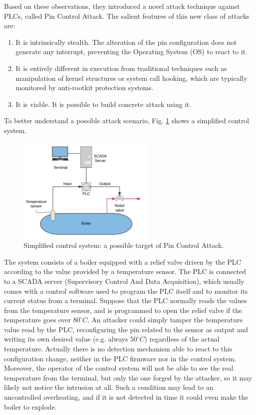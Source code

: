 Based on these observations, they introduced a novel attack technique against PLCs, called Pin Control Attack.
The salient features of this new class of attacks are:
\begin{enumerate}
	\item It is intrinsically stealth. The alteration of the pin configuration does not generate any interrupt, preventing the Operating System (OS) to react to it.
	\item It is entirely different in execution from traditional techniques such as manipulation of kernel structures or system call hooking, which are typically
		monitored by anti-rootkit protection systems.
	\item It is viable. It is possible to build concrete attack using it.
\end{enumerate}

To better understand a possible attack scenario, Fig. \ref{fig:control} shows a simplified control system.
\begin{figure}[h]
\centerline{\includegraphics[width=0.6\textwidth]{res/control}}
\caption{Simplified control system: a possible target of Pin Control Attack.\label{fig:control}}
\end{figure}
The system consists of a boiler equipped with a relief valve driven by the PLC according to the value provided by a temperature sensor.
The PLC is connected to a SCADA server (Supervisory Control And Data Acquisition), which usually comes with a control software used to program the PLC itself
and to monitor its current status from a terminal.
Suppose that the PLC normally reads the values from the temperature sensor, and is programmed to open the relief valve if the temperature goes over $80^\circ C$.
An attacker could simply tamper the temperature value read by the PLC, reconfiguring the pin related to the sensor as output and writing its own desired value
(e.g. always $50^\circ C$) regardless of the actual temperature.
Actually there is no detection mechanism able to react to this configuration change, neither in the PLC firmware nor in the control system.
Moreover, the operator of the control system will not be able to see the real temperature from the terminal, but only the one forged by the attacker,
so it may likely not notice the intrusion at all.
Such a condition may lead to an uncontrolled overheating, and if it is not detected in time it could even make the boiler to explode.


